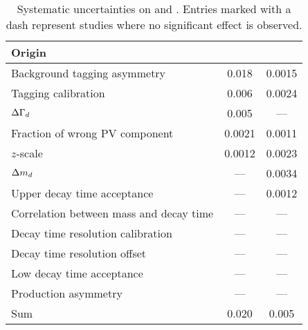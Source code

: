 \begin{table}[htb]
  \caption{Systematic uncertainties on \SJpsiKS and \CJpsiKS. Entries marked
  with a dash represent studies where no significant effect is observed.}
  \label{tab:bd2jpsiks:systematics}
  \centering
    \begin{tabular}{lSS}
      \toprule
      Origin & {\param{\sigma}{}{$\SJpsiKS$}} & {\param{\sigma}{}{$\CJpsiKS$}} \\
      \midrule
      Background tagging asymmetry            &  0.018  &  0.0015 \\
      Tagging calibration                     &  0.006  &  0.0024 \\
      ${\Delta\Gamma_{{d}}}$                                  &  0.005  &  {---} \\
      Fraction of wrong PV component          &  0.0021 &  0.0011 \\
      $z$-scale                               &  0.0012 &  0.0023 \\
      ${\Delta m_{{d}}}$                                  &  {---}  &  0.0034 \\
      Upper decay time acceptance             &  {---}  &  0.0012 \\
      Correlation between mass and decay time &  {---}  &  {---} \\
      Decay time resolution calibration       &  {---}  &  {---} \\
      Decay time resolution offset            &  {---}  &  {---} \\
      Low decay time acceptance               &  {---}  &  {---} \\
      Production asymmetry                    &  {---}  &  {---} \\
      \midrule
      Sum                                     &  0.020  &  0.005 \\
      \bottomrule
    \end{tabular}
\end{table}
